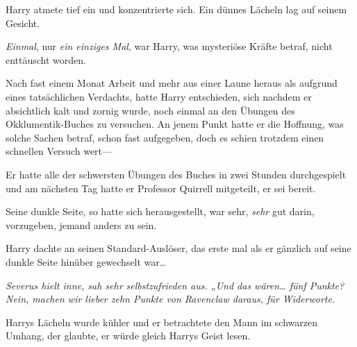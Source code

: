 Harry atmete tief ein und konzentrierte sich. Ein dünnes Lächeln lag auf seinem Gesicht.

\emph{Einmal}, nur \emph{ein einziges Mal}, war Harry, was mysteriöse Kräfte betraf, nicht enttäuscht worden.

Nach fast einem Monat Arbeit und mehr aus einer Laune heraus als aufgrund eines tatsächlichen Verdachts, hatte Harry entschieden, sich nachdem er absichtlich kalt und zornig wurde, noch einmal an den Übungen des Okklumentik-Buches zu versuchen. An jenem Punkt hatte er die Hoffnung, was solche Sachen betraf, schon fast aufgegeben, doch es schien trotzdem einen schnellen Versuch wert—

Er hatte alle der schwersten Übungen des Buches in zwei Stunden durchgespielt und am nächsten Tag hatte er Professor Quirrell mitgeteilt, er sei bereit.

Seine dunkle Seite, so hatte sich herausgestellt, war sehr, \emph{sehr} gut darin, vorzugeben, jemand anders zu sein.

Harry dachte an seinen Standard-Auslöser, das erste mal als er gänzlich auf seine dunkle Seite hinüber gewechselt war…

\emph{Severus hielt inne, sah sehr selbstzufrieden aus. „Und das wären… fünf Punkte? Nein, machen wir lieber zehn Punkte von Ravenclaw daraus, für Widerworte.}

Harrys Lächeln wurde kühler und er betrachtete den Mann im schwarzen Umhang, der glaubte, er würde gleich Harrys Geist lesen.

